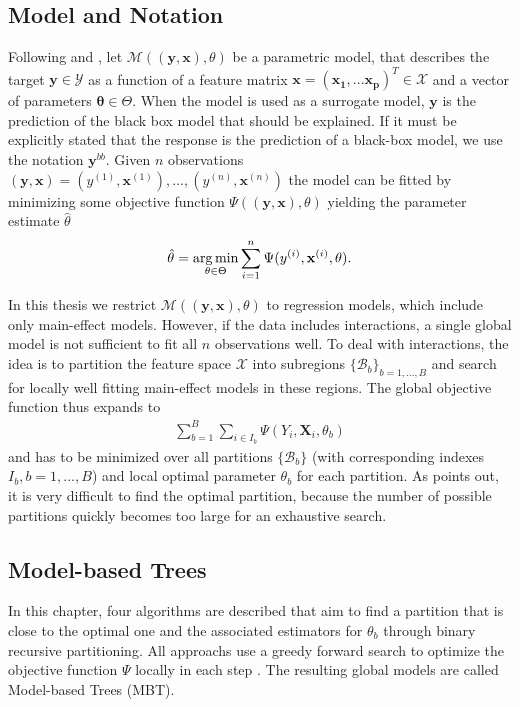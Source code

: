 \subsection{Model and Notation}
Following \citep{Zeileis.2008} and \citep{Seibold.2016}, let $\mathcal{M}((\mathbf{y}, \mathbf{x}), \theta)$ be a parametric model, that describes the target $\mathbf{y} \in \mathcal{Y}$ as a function of a feature matrix $\mathbf{x} = (\mathbf{x_1}, ... \mathbf{x_p})^T \in \mathcal{X}$  and a vector of parameters $\mathbf{\theta} \in \Theta$. When the model is used as a surrogate model, $\mathbf{y}$ is the prediction of the black box model that should be explained.  If it must be explicitly stated that the response is the prediction of a black-box model, we use the notation $\mathbf{y}^{bb}$. Given $n$ observations $(\mathbf{y}, \mathbf{x}) = (y^{(1)}, \mathbf{x}^{(1)}),..., (y^{(n)}, \mathbf{x}^{(n)})$ the model can be fitted by minimizing some objective function $\Psi((\mathbf{y}, \mathbf{x}), \theta)$ yielding the parameter estimate $\hat{\theta}$
\begin{align}
    \hat{\mathbf{\theta}} = \operatorname*{arg\,min}_{\theta \in \Theta} \sum_{i=1}^{n}\Psi(y^{(i)}, \mathbf{x}^{(i)}, \theta).
\end{align}

In this thesis we restrict $\mathcal{M}((\mathbf{y}, \mathbf{x}), \theta)$ to regression models, which include only main-effect models. However, if the data includes interactions, a single global model is not sufficient to fit all $n$ observations well.  To deal with interactions, the idea is to partition the feature space $\mathcal{X}$ into subregions $\{\mathcal{B}_b\}_{b = 1,...,B}$ and search for locally well fitting main-effect models in these regions. The global objective function thus expands to
\begin{align}
    \sum_{b=1}^B\sum_{i \in I_b}\Psi(Y_{i}, \mathbf{X}_{i}, \theta_b)
\end{align}
and has to be minimized over all partitions $\{\mathcal{B}_b\}$ (with corresponding indexes $I_b, b = 1,...,B$) and local optimal parameter $\theta_b$ for each partition. As \citep{Zeileis.2008} points out, it is very difficult to find the optimal partition, because the number of possible partitions quickly becomes too large for an exhaustive search.





\subsection{Model-based Trees}
In this chapter, four algorithms are described that aim to find a partition that is close to the optimal one and the associated estimators for $\theta_b$ through binary recursive partitioning. All approachs use a greedy forward search to optimize the objective function $\Psi$ locally in each step \citep{Zeileis.2008}.  
The resulting global models are called Model-based Trees (MBT).



